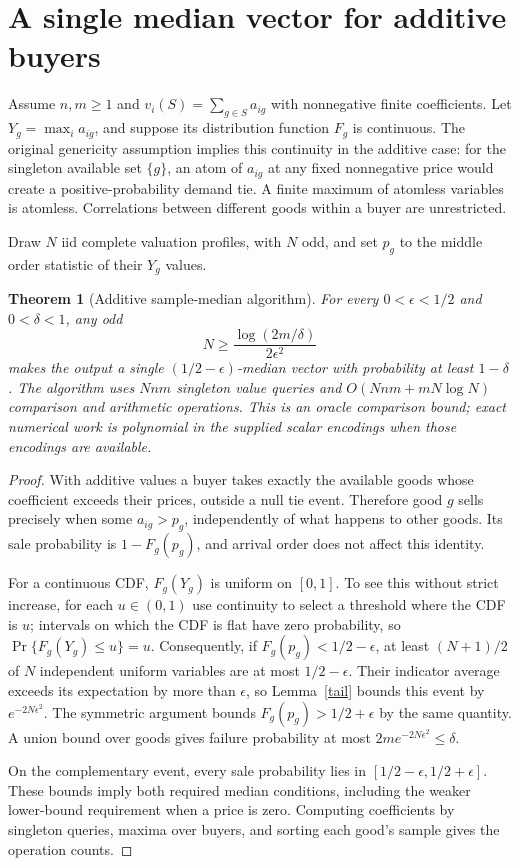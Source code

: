 \documentclass[11pt]{article}
\newtheorem{theorem}{Theorem}
\theoremstyle{remark}
\begin{document}
\section{A single median vector for additive buyers}
Assume $n,m\geq1$ and
$v_i(S)=\sum_{g\in S}a_{ig}$ with nonnegative finite coefficients.
Let $Y_g=\max_i a_{ig}$, and suppose its distribution function $F_g$
is continuous. The original genericity assumption implies this
continuity in the additive case: for the singleton available set
$\{g\}$, an atom of $a_{ig}$ at any fixed nonnegative price would
create a positive-probability demand tie. A finite maximum of atomless
variables is atomless. Correlations between different goods within a
buyer are unrestricted.

Draw $N$ iid complete valuation profiles, with $N$ odd, and set $p_g$
to the middle order statistic of their $Y_g$ values.

\begin{theorem}[Additive sample-median algorithm]\label{additive}
For every $0<\epsilon<1/2$ and $0<\delta<1$, any odd
\[
 N\geq\frac{\log(2m/\delta)}{2\epsilon^2}
\]
makes the output a single $(1/2-\epsilon)$-median vector with
probability at least $1-\delta$. The algorithm uses $Nnm$ singleton
value queries and $O(Nnm+mN\log N)$ comparison and arithmetic
operations. This is an oracle comparison bound; exact numerical work
is polynomial in the supplied scalar encodings when those encodings
are available.
\end{theorem}
\begin{proof}
With additive values a buyer takes exactly the available goods whose
coefficient exceeds their prices, outside a null tie event. Therefore
good $g$ sells precisely when some $a_{ig}>p_g$, independently of what
happens to other goods. Its sale probability is $1-F_g(p_g)$, and
arrival order does not affect this identity.

For a continuous CDF, $F_g(Y_g)$ is uniform on $[0,1]$. To see this
without strict increase, for each $u\in(0,1)$ use continuity to select
a threshold where the CDF is $u$; intervals on which the CDF is flat
have zero probability, so $\Pr\{F_g(Y_g)\leq u\}=u$.
Consequently, if $F_g(p_g)<1/2-\epsilon$, at least $(N+1)/2$ of $N$
independent uniform variables are at most $1/2-\epsilon$. Their
indicator average exceeds its expectation by more than $\epsilon$,
so Lemma~\ref{tail} bounds this event by $e^{-2N\epsilon^2}$.
The symmetric argument bounds $F_g(p_g)>1/2+\epsilon$ by the same
quantity. A union bound over goods gives failure probability at most
$2m e^{-2N\epsilon^2}\leq\delta$.

On the complementary event, every sale probability lies in
$[1/2-\epsilon,1/2+\epsilon]$. These bounds imply both required median
conditions, including the weaker lower-bound requirement when a price
is zero. Computing coefficients by singleton queries, maxima over
buyers, and sorting each good's sample gives the operation counts.
\end{proof}
\end{document}
